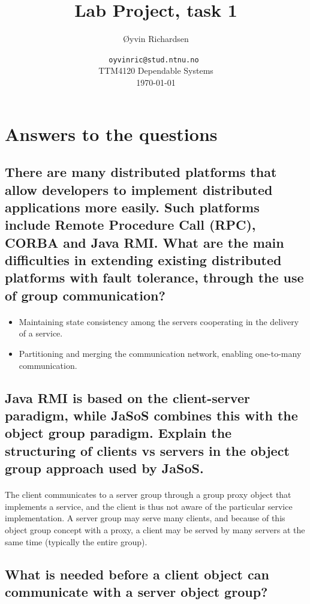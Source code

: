 \documentclass[a4paper,11pt]{article}
\title{Lab Project, task 1}
\author{\O yvin Richardsen}
\date{ {\tt oyvinric@stud.ntnu.no }\\
TTM4120 Dependable Systems\\
\today}
\begin{document}
\maketitle

\section{Answers to the questions}

\subsection{
There are many distributed platforms that allow developers to implement distributed applications more easily.
Such platforms include Remote Procedure Call (RPC), CORBA and Java RMI. What are the main difficulties
in extending existing distributed platforms with fault tolerance, through the use of group communication?
}
\paragraph{}
\begin{itemize}
	\item Maintaining state consistency among the servers cooperating in the delivery of a service.
	\item Partitioning and merging the communication network, enabling one-to-many communication.
\end{itemize}

\subsection{
Java RMI is based on the client-server paradigm, while JaSoS combines this with the object group paradigm.
Explain the structuring of clients vs servers in the object group approach used by JaSoS.
}
\paragraph{}
The client communicates to a server group through a group proxy object that implements a service, and the client is thus not aware of the particular service implementation. A server group may serve many clients, and because of this object group concept with a proxy, a client may be served by many servers at the same time (typically the entire group).

\subsection{
What is needed before a client object can communicate with a server object group?
}
\end{document}
